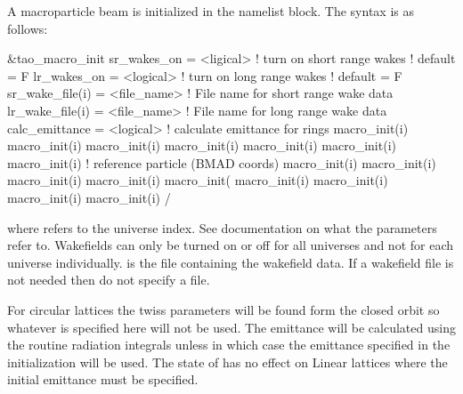 A macroparticle beam is initialized in the  namelist block.
The syntax is as follows:
\begin{example}
  &tao_macro_init
    sr_wakes_on             = <ligical>   ! turn on short range wakes
                                          ! default = F
    lr_wakes_on             = <logical>   ! turn on long range wakes
                                          ! default = F
    sr_wake_file(i)         = <file_name> ! File name for short range wake data
    lr_wake_file(i)         = <file_name> ! File name for long range wake data
    calc_emittance          = <logical>   ! calculate emittance for rings
    macro_init(i)%
    macro_init(i)%
    macro_init(i)%
    macro_init(i)%
    macro_init(i)%
    macro_init(i)%
    macro_init(i)%
                                         ! reference particle (BMAD coords)
    macro_init(i)%
    macro_init(i)%
    macro_init(i)%
    macro_init(i)%
    macro_init(
    macro_init(i)%
    macro_init(i)%
    macro_init(i)%
    macro_init(i)%
  /
\end{example}
where  refers to the universe index. See \bmad documentation on what the
 parameters refer to. Wakefields can only be turned on or off for all
universes and not for each universe individually.  is the file containing the
wakefield data. If a wakefield file is not needed then do not specify a file.

For circular lattices the twiss parameters will be found form the closed orbit
so whatever is specified here will not be used.
The emittance will be calculated using the \bmad routine
radiation integrals unless  in which case the emittance
specified in the initialization will be used. The state of 
has no effect on Linear lattices where the initial emittance must be specified.

